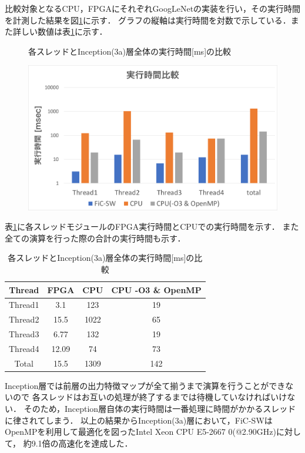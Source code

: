 {比較対象となるCPU，FPGAにそれぞれGoogLeNetの実装を行い，その実行時間を計測した結果を図\ref{fig:exec_graph}に示す．
グラフの縦軸は実行時間を対数で示している．また詳しい数値は表\ref{table:exec_time}に示す．

\begin{figure}[h]
    \centering
    \caption{各スレッドとInception(3a)層全体の実行時間[ms]の比較}
    \includegraphics[width=15cm]{./chap7/fig/exec_time.pdf}
    \caption{}
    \label{fig:exec_graph}
\end{figure}

表\ref{table:exec_time}に各スレッドモジュールのFPGA実行時間とCPUでの実行時間を示す．
また全ての演算を行った際の合計の実行時間も示す．

\begin{table}[p]
    \begin{center}
    \caption{各スレッドとInception(3a)層全体の実行時間[ms]の比較}
    \label{table:exec_time}
    \begin{tabular}{|c|c|c|c|} \hline
    \multicolumn{1}{|c|}{Thread} & \multicolumn{1}{|c|}{FPGA} & \multicolumn{1}{|c|}{CPU} & \multicolumn{1}{|c|}{CPU -O3 \& OpenMP} \\ \hline \hline
    Thread1       & 3.1 & 123 & 19 \\ \hline
    Thread2       & 15.5 & 1022 & 65 \\ \hline
    Thread3       & 6.77 & 132 & 19 \\ \hline
    Thread4       & 12.09 & 74 & 73 \\ \hline
    Total         & 15.5 & 1309 & 142 \\ \hline
    \end{tabular}
    \end{center}
\end{table}

Inception層では前層の出力特徴マップが全て揃うまで演算を行うことができないので
各スレッドはお互いの処理が終了するまでは待機していなければいけない．
そのため，Inception層自体の実行時間は一番処理に時間がかかるスレッドに律されてしまう．
以上の結果からInception(3a)層において，FiC-SWはOpenMPを利用して最適化を図ったIntel Xeon CPU E5-2667 0(@2.90GHz)に対して，
約9.1倍の高速化を達成した．
}
